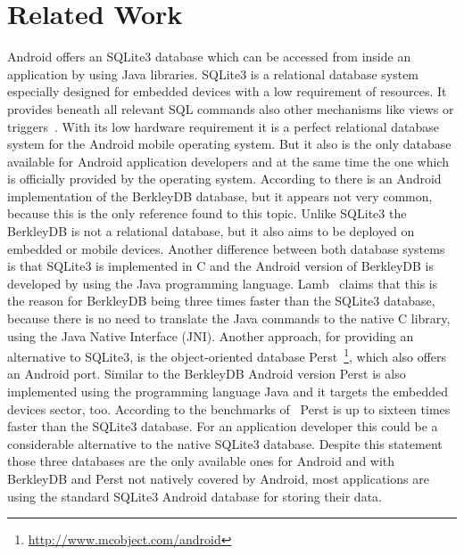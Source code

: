 



\section{Related Work}
\label{sec:overview:related-work}
Android offers an SQLite3 database which can be accessed from inside an application by using Java libraries.
SQLite3 is a relational database system especially designed for embedded devices with a low requirement of resources.
It provides beneath all relevant SQL commands also other mechanisms like views or triggers~\cite{owens2006definitive}.
With its low hardware requirement it is a perfect relational database system for the Android mobile operating system.
But it also is the only database available for Android application developers and at the same time the one which is officially provided by the operating system.
According to \cite{lamb2010berkleydb} there is an Android implementation of the BerkleyDB database, but it appears not very common, because this is the only reference found to this topic.
Unlike SQLite3 the BerkleyDB is not a relational database, but it also aims to be deployed on embedded or mobile devices.
Another difference between both database systems is that SQLite3 is implemented in C and the Android version of BerkleyDB is developed by using the Java programming language.
Lamb~\cite{lamb2010berkleydb} claims that this is the reason for BerkleyDB being three times faster than the SQLite3 database, because there is no need to translate the Java commands to the native C library, using the Java Native Interface (JNI).
Another approach, for providing an alternative to SQLite3, is the object-oriented database Perst~\footnote{\url{http://www.mcobject.com/android}}, which also offers an Android port.
Similar to the BerkleyDB Android version Perst is also implemented using the programming language Java and it targets the embedded devices sector, too.
According to the benchmarks of~\cite{perst-bench} Perst is up to sixteen times faster than the SQLite3 database.
For an application developer this could be a considerable alternative to the native SQLite3 database.
Despite this statement those three databases are the only available ones for Android and with BerkleyDB and Perst not natively covered by Android, most applications are using the standard SQLite3 Android database for storing their data.
